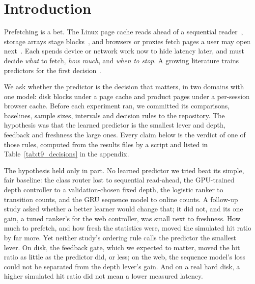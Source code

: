 
\section{Introduction}\label{sec:intro}

Prefetching is a bet. The Linux page cache reads ahead of a sequential
reader~\cite{wu2007readahead,linux_mmapi_readahead}, storage arrays stage
blocks~\cite{gill2005sarc,gill2007amp}, and browsers or proxies fetch pages a
user may open next~\cite{padmanabhan1996using,fan1999web}. Each spends device
or network work now to hide latency later, and must decide \emph{what} to
fetch, \emph{how much}, and \emph{when to stop}. A growing literature trains
predictors for the first decision~\cite{chakraborttii2020learning,
hashemi2018learning,wong2024baleen,savva2026adaptive,hidasi2016session}.

We ask whether the predictor is the decision that matters, in two domains
with one model: disk blocks under a page cache and product pages under a
per-session browser cache. Before each experiment ran, we committed its
comparisons, baselines, sample sizes, intervals and decision rules to the
repository. The hypothesis was that the learned predictor is the smallest
lever and depth, feedback and freshness the large ones. Every claim below is
the verdict of one of those rules, computed from the results files by a script
and listed in Table~\ref{tab:t9_decisions} in the appendix.

The hypothesis held only in part. No learned predictor we tried beat its
simple, fair baseline: the class router lost to sequential read-ahead, the
GPU-trained depth controller to a validation-chosen fixed depth, the logistic
ranker to transition counts, and the GRU sequence model to online counts. A
follow-up study asked whether a better learner would change that; it did not,
and its one gain, a tuned ranker's for the web controller, was small next to
freshness. How
much to prefetch, and how fresh the statistics were, moved the simulated hit
ratio by far more. Yet neither study's ordering rule calls the predictor the
smallest lever. On disk, the feedback gate, which we expected to matter,
moved the hit ratio as little as the predictor did, or less; on the web, the
sequence model's loss could not be separated from the depth lever's gain. And on a real
hard disk, a higher simulated hit ratio did not mean a lower measured latency.

